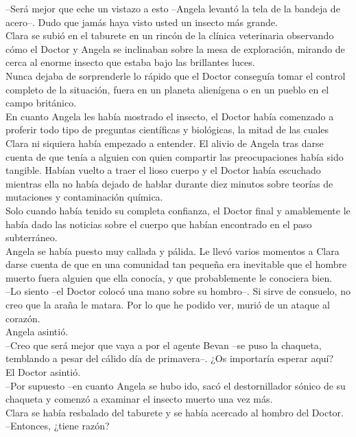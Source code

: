 {--Será mejor que eche un vistazo a esto --Angela levantó la tela de la
bandeja de acero--. Dudo que jamás haya visto usted un insecto más
grande.\\[2\baselineskip]Clara se subió en el taburete en un rincón de
la clínica veterinaria observando cómo el Doctor y Angela se inclinaban
sobre la mesa de exploración, mirando de cerca al enorme insecto que
estaba bajo las brillantes luces.\\
Nunca dejaba de sorprenderle lo rápido que el Doctor conseguía tomar el
control completo de la situación, fuera en un planeta alienígena o en un
pueblo en el campo británico.\\
En cuanto Angela les había mostrado el insecto, el Doctor había
comenzado a proferir todo tipo de preguntas científicas y biológicas, la
mitad de las cuales Clara ni siquiera había empezado a entender. El
alivio de Angela tras darse cuenta de que tenía a alguien con quien
compartir las preocupaciones había sido tangible. Habían vuelto a traer
el lioso cuerpo y el Doctor había escuchado mientras ella no había
dejado de hablar durante diez minutos sobre teorías de mutaciones y
contaminación química.\\
Solo cuando había tenido su completa confianza, el Doctor final y
amablemente le había dado las noticias sobre el cuerpo que habían
encontrado en el paso subterráneo.\\
Angela se había puesto muy callada y pálida. Le llevó varios momentos a
Clara darse cuenta de que en una comunidad tan pequeña era inevitable
que el hombre muerto fuera alguien que ella conocía, y que probablemente
le conociera bien.\\
--Lo siento --el Doctor colocó una mano sobre su hombro--. Si sirve de
consuelo, no creo que la araña le matara. Por lo que he podido ver,
murió de un ataque al corazón.\\
Angela asintió.\\
--Creo que será mejor que vaya a por el agente Bevan --se puso la
chaqueta, temblando a pesar del cálido día de primavera--. ¿Os
importaría esperar aquí?\\
El Doctor asintió.\\
--Por supuesto --en cuanto Angela se hubo ido, sacó el destornillador
sónico de su chaqueta y comenzó a examinar el insecto muerto una vez
más.\\
Clara se había resbalado del taburete y se había acercado al hombro del
Doctor.\\
--Entonces, ¿tiene razón?\\
}
